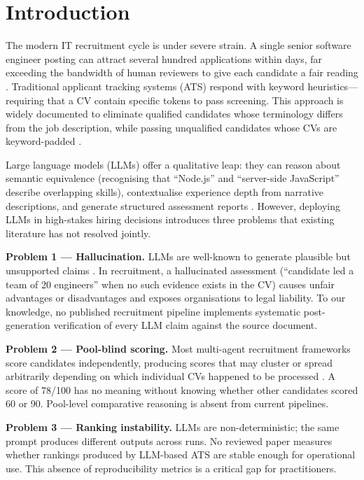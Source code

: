 \documentclass[journal]{IEEEtran}
\begin{document}
\section{Introduction}
\label{sec:intro}

The modern IT recruitment cycle is under severe strain. A single senior software
engineer posting can attract several hundred applications within days, far exceeding
the bandwidth of human reviewers to give each candidate a fair reading
\cite{chowdhury2026}. Traditional applicant tracking systems (ATS) respond with
keyword heuristics—requiring that a CV contain specific tokens to pass screening.
This approach is widely documented to eliminate qualified candidates whose
terminology differs from the job description, while passing unqualified candidates
whose CVs are keyword-padded \cite{ajjam2026}.

Large language models (LLMs) offer a qualitative leap: they can reason about
semantic equivalence (recognising that ``Node.js'' and ``server-side JavaScript''
describe overlapping skills), contextualise experience depth from narrative
descriptions, and generate structured assessment reports \cite{lo2025,yuksel2026}.
However, deploying LLMs in high-stakes hiring decisions introduces three
problems that existing literature has not resolved jointly.

\textbf{Problem 1 — Hallucination.} LLMs are well-known to generate plausible but
unsupported claims \cite{chowdhury2026}. In recruitment, a hallucinated assessment
(``candidate led a team of 20 engineers'' when no such evidence exists in the CV)
causes unfair advantages or disadvantages and exposes organisations to legal
liability. To our knowledge, no published recruitment pipeline implements
systematic post-generation verification of every LLM claim against the source
document.

\textbf{Problem 2 — Pool-blind scoring.} Most multi-agent recruitment frameworks
score candidates independently, producing scores that may cluster or spread
arbitrarily depending on which individual CVs happened to be processed
\cite{hoque2026,chowdhury2026}. A score of 78/100 has no meaning without knowing
whether other candidates scored 60 or 90. Pool-level comparative reasoning is
absent from current pipelines.

\textbf{Problem 3 — Ranking instability.} LLMs are non-deterministic; the same
prompt produces different outputs across runs. No reviewed paper measures whether
rankings produced by LLM-based ATS are stable enough for operational use. This
absence of reproducibility metrics is a critical gap for practitioners.
\end{document}
